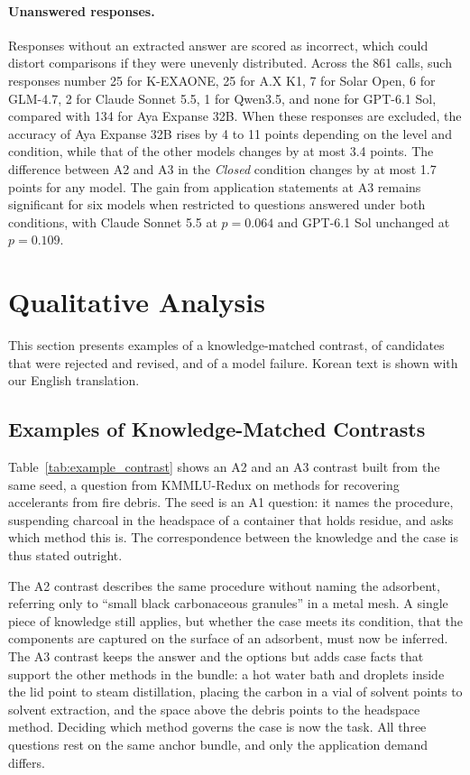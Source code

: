 

\paragraph{Unanswered responses.}
Responses without an extracted answer are scored as incorrect, which could distort comparisons if they were unevenly distributed.
Across the 861 calls, such responses number 25 for K-EXAONE, 25 for A.X K1, 7 for Solar Open, 6 for GLM-4.7, 2 for Claude Sonnet 5.5, 1 for Qwen3.5, and none for GPT-6.1 Sol, compared with 134 for Aya Expanse 32B.
When these responses are excluded, the accuracy of Aya Expanse 32B rises by 4 to 11 points depending on the level and condition, while that of the other models changes by at most 3.4 points.
The difference between A2 and A3 in the \textit{Closed} condition changes by at most 1.7 points for any model.
The gain from application statements at A3 remains significant for six models when restricted to questions answered under both conditions, with Claude Sonnet 5.5 at $p = 0.064$ and GPT-6.1 Sol unchanged at $p = 0.109$.


\section{Qualitative Analysis}
\label{app:qualitative}

This section presents examples of a knowledge-matched contrast, of candidates that were rejected and revised, and of a model failure.
Korean text is shown with our English translation.

\subsection{Examples of Knowledge-Matched Contrasts}

Table~\ref{tab:example_contrast} shows an A2 and an A3 contrast built from the same seed, a question from KMMLU-Redux on methods for recovering accelerants from fire debris.
The seed is an A1 question: it names the procedure, suspending charcoal in the headspace of a container that holds residue, and asks which method this is.
The correspondence between the knowledge and the case is thus stated outright.

The A2 contrast describes the same procedure without naming the adsorbent, referring only to ``small black carbonaceous granules'' in a metal mesh.
A single piece of knowledge still applies, but whether the case meets its condition, that the components are captured on the surface of an adsorbent, must now be inferred.
The A3 contrast keeps the answer and the options but adds case facts that support the other methods in the bundle: a hot water bath and droplets inside the lid point to steam distillation, placing the carbon in a vial of solvent points to solvent extraction, and the space above the debris points to the headspace method.
Deciding which method governs the case is now the task.
All three questions rest on the same anchor bundle, and only the application demand differs.

